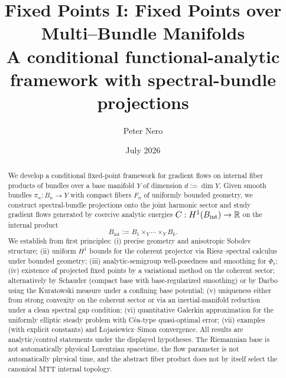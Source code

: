 \documentclass[11pt]{article}
\title{Fixed Points I: Fixed Points over Multi--Bundle Manifolds\\
\large A conditional functional-analytic framework with spectral-bundle projections}
\author{Peter Nero}
\date{July 2026}
\providecommand{\Bint}{B_{\mathrm{int}}}
\begin{document}
\maketitle
\seriestagline

\begin{abstract}
We develop a conditional fixed-point framework for gradient flows on internal fiber
products of bundles over a base manifold $Y$ of dimension $d := \dim Y$. Given smooth
bundles $\pi_n : B_n \to Y$ with compact fibers $F_n$ of uniformly bounded geometry, we
construct spectral-bundle projections onto the joint harmonic sector and study gradient
flows generated by coercive analytic energies $C : H^1(\Bint)\to \bbR$ on the internal product
\[
\Bint := B_1 \times_Y \cdots \times_Y B_k .
\]
We establish from first principles:
(i) precise geometry and anisotropic Sobolev structure;
(ii) uniform $H^1$ bounds for the coherent projector via Riesz--spectral calculus under bounded geometry;
(iii) analytic-semigroup well-posedness and smoothing for $\Phi_t$;
(iv) existence of projected fixed points by a variational method on the coherent sector; alternatively by Schauder (compact base with base-regularized smoothing) or by Darbo using the Kuratowski measure under a confining base potential;
(v) uniqueness either from strong convexity on the coherent sector or via an inertial-manifold reduction under a clean spectral gap condition;
(vi) quantitative Galerkin approximation for the uniformly elliptic steady problem with C\'ea-type quasi-optimal error;
(vii) examples (with explicit constants) and \L{}ojasiewicz--Simon convergence.
All results are analytic/control statements under the displayed hypotheses. The
Riemannian base is not automatically physical Lorentzian spacetime, the flow
parameter is not automatically physical time, and the abstract fiber product
does not by itself select the canonical MTT internal topology.
\end{abstract}
\end{document}
